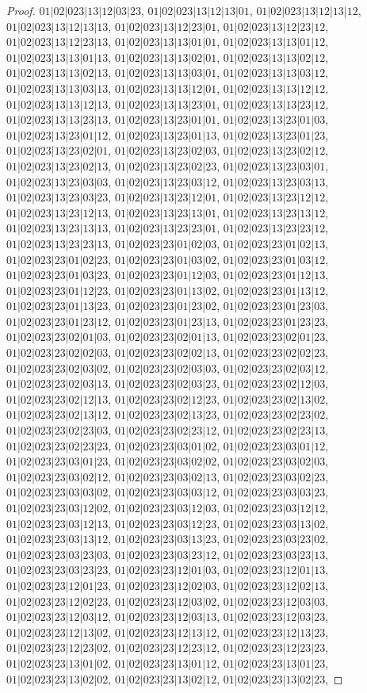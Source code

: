 \documentclass[12pt]{article}
\theoremstyle{plain}
\theoremstyle{definition}
\theoremstyle{remark}
\begin{document}
\begin{proof}
$01|02|023|13|12|03|23$, $01|02|023|13|12|13|01$, $01|02|023|13|12|13|12$, $01|02|023|13|12|13|13$, $01|02|023|13|12|23|01$, $01|02|023|13|12|23|12$, $01|02|023|13|12|23|13$, $01|02|023|13|13|01|01$, $01|02|023|13|13|01|12$, $01|02|023|13|13|01|13$, $01|02|023|13|13|02|01$, $01|02|023|13|13|02|12$, $01|02|023|13|13|02|13$, $01|02|023|13|13|03|01$, $01|02|023|13|13|03|12$, $01|02|023|13|13|03|13$, $01|02|023|13|13|12|01$, $01|02|023|13|13|12|12$, $01|02|023|13|13|12|13$, $01|02|023|13|13|23|01$, $01|02|023|13|13|23|12$, $01|02|023|13|13|23|13$, $01|02|023|13|23|01|01$, $01|02|023|13|23|01|03$, $01|02|023|13|23|01|12$, $01|02|023|13|23|01|13$, $01|02|023|13|23|01|23$, $01|02|023|13|23|02|01$, $01|02|023|13|23|02|03$, $01|02|023|13|23|02|12$, $01|02|023|13|23|02|13$, $01|02|023|13|23|02|23$, $01|02|023|13|23|03|01$, $01|02|023|13|23|03|03$, $01|02|023|13|23|03|12$, $01|02|023|13|23|03|13$, $01|02|023|13|23|03|23$, $01|02|023|13|23|12|01$, $01|02|023|13|23|12|12$, $01|02|023|13|23|12|13$, $01|02|023|13|23|13|01$, $01|02|023|13|23|13|12$, $01|02|023|13|23|13|13$, $01|02|023|13|23|23|01$, $01|02|023|13|23|23|12$, $01|02|023|13|23|23|13$, $01|02|023|23|01|02|03$, $01|02|023|23|01|02|13$, $01|02|023|23|01|02|23$, $01|02|023|23|01|03|02$, $01|02|023|23|01|03|12$, $01|02|023|23|01|03|23$, $01|02|023|23|01|12|03$, $01|02|023|23|01|12|13$, $01|02|023|23|01|12|23$, $01|02|023|23|01|13|02$, $01|02|023|23|01|13|12$, $01|02|023|23|01|13|23$, $01|02|023|23|01|23|02$, $01|02|023|23|01|23|03$, $01|02|023|23|01|23|12$, $01|02|023|23|01|23|13$, $01|02|023|23|01|23|23$, $01|02|023|23|02|01|03$, $01|02|023|23|02|01|13$, $01|02|023|23|02|01|23$, $01|02|023|23|02|02|03$, $01|02|023|23|02|02|13$, $01|02|023|23|02|02|23$, $01|02|023|23|02|03|02$, $01|02|023|23|02|03|03$, $01|02|023|23|02|03|12$, $01|02|023|23|02|03|13$, $01|02|023|23|02|03|23$, $01|02|023|23|02|12|03$, $01|02|023|23|02|12|13$, $01|02|023|23|02|12|23$, $01|02|023|23|02|13|02$, $01|02|023|23|02|13|12$, $01|02|023|23|02|13|23$, $01|02|023|23|02|23|02$, $01|02|023|23|02|23|03$, $01|02|023|23|02|23|12$, $01|02|023|23|02|23|13$, $01|02|023|23|02|23|23$, $01|02|023|23|03|01|02$, $01|02|023|23|03|01|12$, $01|02|023|23|03|01|23$, $01|02|023|23|03|02|02$, $01|02|023|23|03|02|03$, $01|02|023|23|03|02|12$, $01|02|023|23|03|02|13$, $01|02|023|23|03|02|23$, $01|02|023|23|03|03|02$, $01|02|023|23|03|03|12$, $01|02|023|23|03|03|23$, $01|02|023|23|03|12|02$, $01|02|023|23|03|12|03$, $01|02|023|23|03|12|12$, $01|02|023|23|03|12|13$, $01|02|023|23|03|12|23$, $01|02|023|23|03|13|02$, $01|02|023|23|03|13|12$, $01|02|023|23|03|13|23$, $01|02|023|23|03|23|02$, $01|02|023|23|03|23|03$, $01|02|023|23|03|23|12$, $01|02|023|23|03|23|13$, $01|02|023|23|03|23|23$, $01|02|023|23|12|01|03$, $01|02|023|23|12|01|13$, $01|02|023|23|12|01|23$, $01|02|023|23|12|02|03$, $01|02|023|23|12|02|13$, $01|02|023|23|12|02|23$, $01|02|023|23|12|03|02$, $01|02|023|23|12|03|03$, $01|02|023|23|12|03|12$, $01|02|023|23|12|03|13$, $01|02|023|23|12|03|23$, $01|02|023|23|12|13|02$, $01|02|023|23|12|13|12$, $01|02|023|23|12|13|23$, $01|02|023|23|12|23|02$, $01|02|023|23|12|23|12$, $01|02|023|23|12|23|23$, $01|02|023|23|13|01|02$, $01|02|023|23|13|01|12$, $01|02|023|23|13|01|23$, $01|02|023|23|13|02|02$, $01|02|023|23|13|02|12$, $01|02|023|23|13|02|23$, 
\end{proof}
\end{document}
